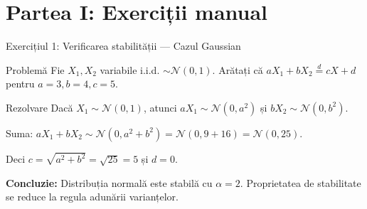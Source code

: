 \documentclass[9pt, aspectratio=169, t]{beamer}
\theoremstyle{definition}
\begin{document}
\section{Partea I: Exerciții manual}

\begin{frame}{Exercițiul 1: Verificarea stabilității --- Cazul Gaussian}
\begin{block}{Problemă}
Fie $X_1, X_2$ variabile i.i.d. $\sim \mathcal{N}(0, 1)$. Arătați că
$a X_1 + b X_2 \stackrel{d}{=} c X + d$ pentru $a=3, b=4, c=5$.
\end{block}

\begin{exampleblock}{Rezolvare}
Dacă $X_1 \sim \mathcal{N}(0, 1)$, atunci $aX_1 \sim \mathcal{N}(0, a^2)$ și $bX_2 \sim \mathcal{N}(0, b^2)$.

Suma: $aX_1 + bX_2 \sim \mathcal{N}(0, a^2 + b^2) = \mathcal{N}(0, 9 + 16) = \mathcal{N}(0, 25)$.

Deci $c = \sqrt{a^2 + b^2} = \sqrt{25} = 5$ și $d = 0$.

\vspace{0.2cm}
\textbf{Concluzie:} Distribuția normală este stabilă cu $\alpha = 2$. Proprietatea de stabilitate se reduce la regula adunării varianțelor.
\end{exampleblock}
\end{frame}
\end{document}
